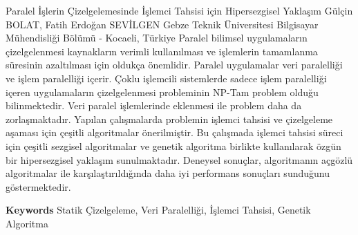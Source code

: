 
    \begin{abstract_online}{Paralel İşlerin Çizelgelemesinde İşlemci Tahsisi için Hipersezgisel Yaklaşım}{%
        Gülçin BOLAT, Fatih Erdoğan SEVİLGEN}{%
        }{%
        Gebze Teknik Üniversitesi Bilgisayar Mühendisliği Bölümü - Kocaeli, Türkiye}
    Paralel bilimsel uygulamaların çizelgelenmesi kaynakların verimli kullanılması ve işlemlerin tamamlanma süresinin azaltılması için oldukça önemlidir. Paralel uygulamalar veri paralelliği ve işlem paralelliği içerir. Çoklu işlemcili sistemlerde sadece işlem paralelliği içeren uygulamaların çizelgelenmesi probleminin NP-Tam problem olduğu bilinmektedir. Veri paralel işlemlerinde eklenmesi ile problem daha da zorlaşmaktadır. Yapılan çalışmalarda problemin işlemci tahsisi ve çizelgeleme aşaması için çeşitli algoritmalar önerilmiştir. Bu çalışmada işlemci tahsisi süreci için çeşitli sezgisel algoritmalar ve genetik algoritma birlikte kullanılarak özgün bir hipersezgisel yaklaşım sunulmaktadır. Deneysel sonuçlar, algoritmanın açgözlü algoritmalar ile karşılaştırıldığında daha iyi performans sonuçları sunduğunu göstermektedir. 
    
        \textbf{Keywords} \newline{}Statik Çizelgeleme, Veri Paralelliği, İşlemci Tahsisi, Genetik Algoritma
    \end{abstract_online}
    